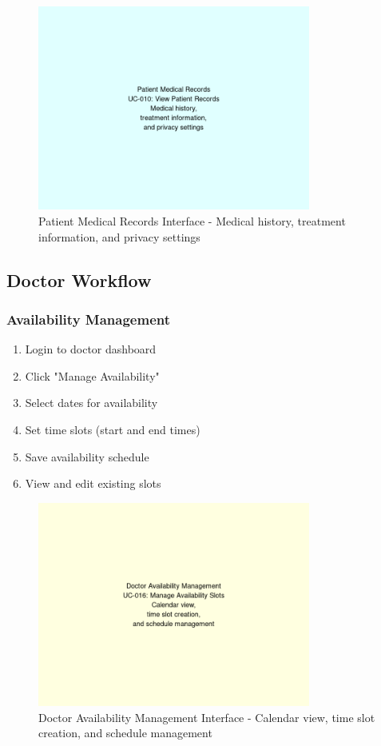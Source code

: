 \documentclass[12pt,a4paper]{article}
\begin{document}
\begin{figure}[H]
\centering
\includegraphics[width=0.8\textwidth]{images/patient_records.png}
\caption{Patient Medical Records Interface - Medical history, treatment information, and privacy settings}
\end{figure}

\subsection{Doctor Workflow}

\subsubsection{Availability Management}

\begin{enumerate}
    \item Login to doctor dashboard
    \item Click "Manage Availability"
    \item Select dates for availability
    \item Set time slots (start and end times)
    \item Save availability schedule
    \item View and edit existing slots
\end{enumerate}

\begin{figure}[H]
\centering
\includegraphics[width=0.8\textwidth]{images/doctor_availability.png}
\caption{Doctor Availability Management Interface - Calendar view, time slot creation, and schedule management}
\end{figure}
\end{document}
